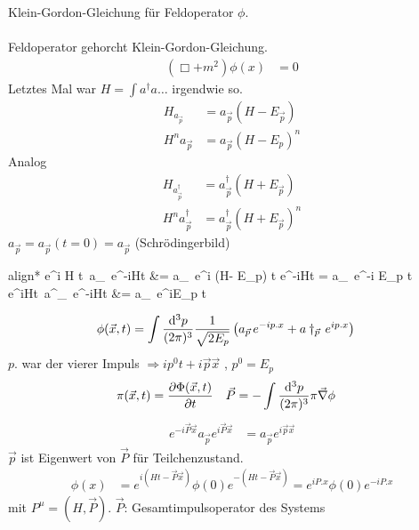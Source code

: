 Klein-Gordon-Gleichung für Feldoperator $\phi$.
\\ \\	
Feldoperator gehorcht Klein-Gordon-Gleichung.	
	\begin{align*}
		(\Box + m^2) \phi(x) &= 0
	\end{align*}
Letztes Mal war $H = \int a^\dagger a \ldots$ irgendwie so.
	\begin{align*}
		H_{a_{\vec{p}}} &= a_{\vec{p}}(H - E_{\vec{p}}) \\
		H^n a_{\vec{p}} &= a_{\vec{p}}(H - E_p)^n
	\end{align*}
Analog 
	\begin{align*}
		H_{a^\dagger_{\vec{p}}} &= a^\dagger_{\vec{p}}(H + E_{\vec{p}}) \\
		H^n a^\dagger_{\vec{p}} &= a^\dagger_{\vec{p}} (H + E_{\vec{p}})^n
	\end{align*}
$a_{\vec{p}} = a_{\vec{p}} (t = 0) = a_{\vec{p}}$ (Schrödingerbild) 
	\begin{empheq}[box = \boxed]{align*}
		e^{i H t} \,a_{}\, e^{-iHt} &= a_{} \,e^{i (H- E_p) t} e^{-iHt} = a_{} \,e^{-i E_p t} \\
		e^{iHt} \,a^\dagger_{}\, e^{-iHt} &= a\dagger_{} \,e^{iE_p t}
	\end{empheq}
	\begin{align*}
		\phi (\vec{x}, t) &= \int \frac{\mathrm{d}^3 p}{(2 \pi)^3} \frac{1}{\sqrt{2 E_p}}
		\left(
			a_{\vec{p}} \,e^{-ip. x} + a\dagger_{\vec{p}} \,e^{ip. x}
		\right)
	\end{align*}
$p.$ war der vierer Impuls $\Rightarrow ip^0t + i \vec{p} \vec{x}$ , $p^0 = E_p$
	\begin{align*}
		\pi(\vec{x}, t) &= \frac{\partial \Phi (\vec{x}, t)}{\partial t} &
		\vec{P} &= -\int \frac{\mathrm{d}^3 p}{(2\pi)^3} \pi \vec{\nabla} \phi
	\end{align*}
	\begin{align*}
		e^{-i \vec{P} \vec{x}} a_{\vec{p}} e^{i \vec{P} \vec{x}} &= 
		a_{\vec{p}} e^{i \vec{p} \vec{x}}
	\end{align*}
$\vec{p}$ ist Eigenwert von $\vec{P}$ für Teilchenzustand.
	\begin{align*}
		\phi(x) &= e^{i(Ht - \vec{P} \vec{x})} \phi (0) e^{- (Ht- \vec{P} \vec{x})} 
		= e^{i P. x} \phi(0) e^{-i P. x}
	\end{align*}
mit $P^\mu = (H, \vec{P})$. $\vec{P}$: Gesamtimpulsoperator des  Systems                              